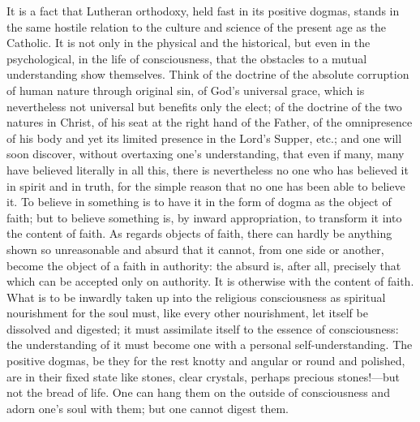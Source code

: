 \documentclass[12pt,a4paper,openany]{book}
\newcommand{\opage}[1]{\marginnote{\footnotesize\textit{[#1]}}}
\begin{document}
It is a fact that Lutheran orthodoxy, held fast in its positive dogmas,
stands in the same hostile relation to the culture and science of the
present age as the Catholic. It is not only in the physical and the
historical, but even in the psychological, in the life of
consciousness, that the obstacles to a mutual understanding show
themselves. Think of the doctrine of the absolute corruption of human
nature through original sin, of God's universal grace, which is
nevertheless not universal but benefits only the elect; of the doctrine
of the two natures in Christ, of his seat at the right hand of the
Father, of the omnipresence of his body and yet its limited presence in
the Lord's Supper, etc.; and one will soon discover, without overtaxing
one's understanding, that even if many, many have believed literally in
all this, there is nevertheless no one who has believed it in spirit and
in truth, for the simple reason that no one has been able to believe it.
To believe in something is to have it in the form of dogma as the
object of faith; but to believe something is, by inward appropriation,
to transform it into the content of faith. As regards objects of faith,
there can hardly be anything shown so unreasonable and absurd that it
cannot, from one side or another, become \opage{27}the object of a faith in
authority: the absurd is, after all, precisely that which can be
accepted only on authority. It is otherwise with the content of faith.
What is to be inwardly taken up into the religious consciousness as
spiritual nourishment for the soul must, like every other nourishment,
let itself be dissolved and digested; it must assimilate itself to the
essence of consciousness: the understanding of it must become one with a
personal self-understanding. The positive dogmas, be they for the rest
knotty and angular or round and polished, are in their fixed state like
stones, clear crystals, perhaps precious stones!---but not the bread of
life. One can hang them on the outside of consciousness and adorn one's
soul with them; but one cannot digest them.
\end{document}
